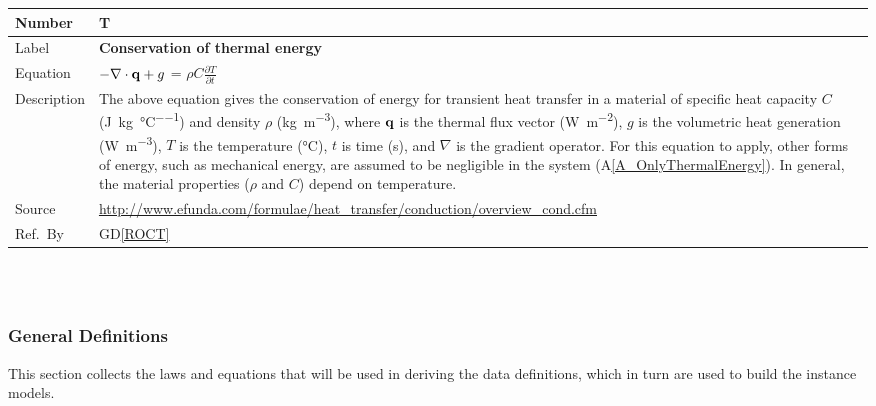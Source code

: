 \documentclass[12pt]{article}
\newcommand{\colAwidth}{0.13\textwidth}
\newcommand{\colBwidth}{0.82\textwidth}
\newcommand{\dref}[1]{GD\ref{#1}}
\newcounter{theorynum} %
\newcommand{\aref}[1]{A\ref{#1}}
\begin{document}
\noindent
\begin{minipage}{\textwidth}
	\renewcommand*{\arraystretch}{1.5}
	\begin{tabular}{| p{\colAwidth} | p{\colBwidth}|}
		  \hline
		  \rowcolor[gray]{0.9}
		  Number& T{theorynum}\thetheorynum \label{T_COE}\\
		  \hline
		  Label&\bf Conservation of thermal energy\\
		  \hline
		  Equation&  $-{\bf \nabla \cdot q} + g$ = $\rho C \frac{\partial T}{\partial t}$\\
		  \hline
		  Description & 
		                The above equation gives the conservation of energy for transient heat transfer in a material
		                of specific heat capacity $C$ (\si{\joule\per\kilogram\per\celsius}) and density $\rho$ 
		                (\si{\kilogram\per\cubic\metre}), where $\bf q$ is the thermal flux vector (\si{\watt\per\square\metre}),
		                $g$ is the volumetric heat generation
		                (\si{\watt\per\cubic\metre}), $T$ is the temperature
		                (\si{\celsius}),  $t$ is time (\si{\second}), and $\nabla$ is
		                the gradient operator.  For this equation to apply, other forms
		                of energy, such as mechanical energy, are assumed to be negligible in the
		                system (\aref{A_OnlyThermalEnergy}).  In general, the material properties ($\rho$ and $C$) depend on temperature.\\
		  \hline
		  Source &
		           \url{http://www.efunda.com/formulae/heat_transfer/conduction/overview_cond.cfm}\\
		  \hline
		  Ref.\ By & \dref{ROCT}\\
		  \hline
	\end{tabular}
\end{minipage}\\

~\newline

\subsubsection{General Definitions}\label{sec_gendef}

This section collects the laws and equations that will be used in deriving the
data definitions, which in turn are used to build the instance models.
  
\end{document}
